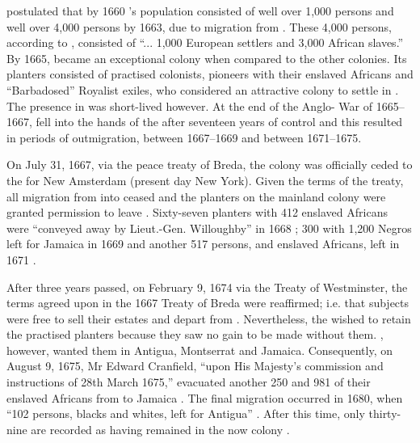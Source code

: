 \citet{Campbell86} postulated that by 1660 's population consisted of well over 1,000 persons and well over 4,000 persons by 1663, due to migration from . These 4,000 persons, according to \citet[44]{Jacobs09}, consisted of ``... 1,000 European settlers and 3,000 African slaves.'' By 1665,  became an exceptional colony when compared to the other  colonies. Its planters consisted of practised colonists,  pioneers with their enslaved Africans and {``Barbadosed''} Royalist exiles, who considered  an attractive colony to settle in \citep{Harlow26, Pugh57, Wheeler02, Arbell02, Manning06}. The  presence in  was short-lived however. At the end of the Anglo- War of 1665--1667,  fell into the hands of the  after seventeen years of  control and this resulted in periods of  outmigration, between 1667--1669 and between 1671--1675.

On July 31, 1667, via the peace treaty of Breda, the colony was officially ceded to the  for New Amsterdam (present day New York). Given the terms of the treaty, all migration from  into  ceased and the  planters on the mainland colony were granted permission to leave \citep{Arbell02}. Sixty-seven  planters with 412 enslaved Africans were ``conveyed away by Lieut.-Gen. Willoughby'' in 1668 \citep[no. 1759 II]{Sainsbury80}; 300  with 1,200 Negros left for Jamaica in 1669 \citep{Sainsbury89, Griffiths97} and another 517 persons,  and enslaved Africans, left in 1671 \citep{Sainsbury80}.

After three years passed, on February 9, 1674 via the Treaty of Westminster, the terms agreed upon in the 1667 Treaty of Breda were reaffirmed; i.e. that  subjects were free to sell their estates and depart from . Nevertheless, the  wished to retain the practised  planters because they saw no gain to be made without them. , however, wanted them in Antigua, Montserrat and Jamaica. Consequently, on August 9, 1675, Mr Edward Cranfield, ``upon His Majesty's commission and instructions of 28th March 1675,'' evacuated another 250  and 981 of their enslaved Africans from  to Jamaica \citep[No. 932]{Sainsbury93}. The final migration occurred in 1680, when ``102 persons, blacks and whites, left  for Antigua'' \citep[No. 1291]{Sainsbury89c}. After this time, only thirty-nine  are recorded as having remained in the now  colony \citep{Faber98, Godfrey95, Arbell02}.

